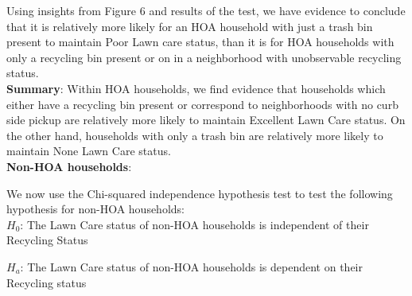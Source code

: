 \documentclass{article}
\begin{document}
Using insights from Figure 6 and results of the test, we have evidence to conclude that it is relatively more likely for an HOA household with just a trash bin present to maintain Poor Lawn care status, than it is for HOA households with only a recycling bin present or on in a neighborhood with unobservable recycling status.\\

\textbf{Summary}: Within HOA households, we find evidence that households which either have a recycling bin present or correspond to neighborhoods with no curb side pickup are relatively more likely to maintain Excellent Lawn Care status. On the other hand, households with only a trash bin are relatively more likely to maintain None Lawn Care status. \\

\textbf{Non-HOA households}:


We now use the Chi-squared independence hypothesis test to test the following hypothesis for non-HOA households:\\

$H_{0}$: The Lawn Care status of non-HOA households is independent of their Recycling Status

$H_{a}$: The Lawn Care status of non-HOA households is dependent on their Recycling status\\
\end{document}
